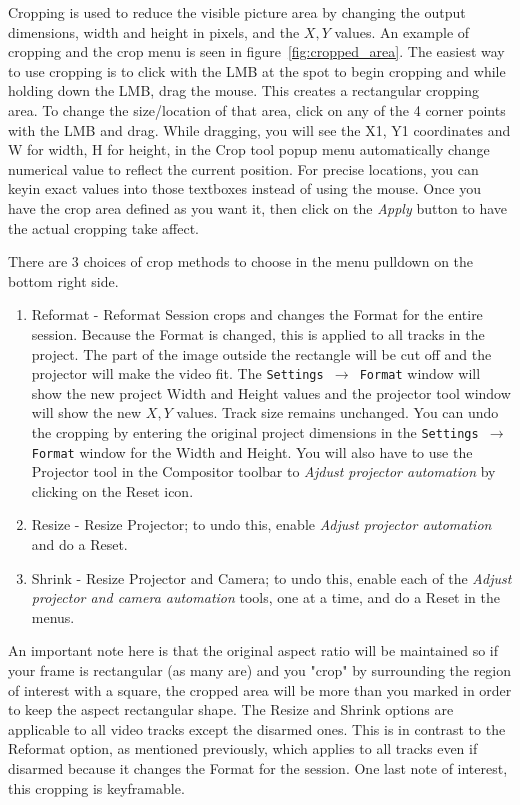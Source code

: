 Cropping is used to reduce the visible picture area by changing the output dimensions, width and
height in pixels, and the $X, Y$ values. An example of cropping and the crop menu is seen in
figure~\ref{fig:cropped_area}.
The easiest way to use cropping is to click with the LMB 
at the spot to begin cropping and while holding down the LMB, drag the mouse. This creates a rectangular
cropping area.  To change the size/location of that area, click on any of the 4 corner points
with the LMB and drag.  While dragging, you will see 
the X1, Y1 coordinates and W for width, H for height, in the Crop tool popup menu
automatically change numerical value to reflect the current position. For precise locations, you
can keyin exact values into those textboxes instead of using the mouse.
Once you have the crop area defined as you want it, then click on the \textit{Apply} button to have
the actual cropping take affect.

There are 3 choices of crop methods to choose in the menu pulldown on the bottom right side.
\begin{enumerate}
     \item Reformat - Reformat Session crops and changes the Format for the entire session. 
Because the Format is changed, this is applied to all tracks in the project. 
The part of the image outside the rectangle will be cut off and the projector will make the video fit.
The  \texttt{Settings $\rightarrow$ Format} window will show the new project Width and Height values and
the projector tool window will show the new $X, Y$ values. Track size remains unchanged.
You can undo the cropping by entering the original project dimensions in the
\texttt{Settings $\rightarrow$ Format} window for the Width and Height.  You will also have to use the Projector
tool in the Compositor toolbar to \textit{Ajdust projector automation} by clicking on the Reset icon.
     \item Resize - Resize Projector; to undo this, enable \textit{Adjust projector automation} 
and do a Reset.
     \item Shrink - Resize Projector and Camera; to undo this, enable each of the \textit{Adjust
projector and camera automation} tools, one at a time, and do a Reset in the menus.
\end{enumerate}
An important note here is that the original aspect ratio will be maintained so if your frame is
rectangular (as many are) and you "crop" by surrounding the region of interest with a square,
the cropped area will be more than you marked in order to keep the aspect rectangular shape.
The Resize and Shrink options are applicable to all video tracks except the disarmed ones. 
This is in contrast to the Reformat option, as mentioned previously, which applies to all tracks even if disarmed because it changes the Format for the session.
One last note of interest, this cropping is keyframable.


